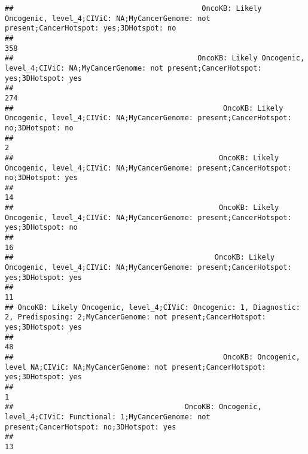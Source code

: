 \documentclass[
]{article}
\begin{document}
\begin{verbatim}
##                                            OncoKB: Likely Oncogenic, level_4;CIViC: NA;MyCancerGenome: not present;CancerHotspot: yes;3DHotspot: no 
##                                                                                                                                                 358 
##                                           OncoKB: Likely Oncogenic, level_4;CIViC: NA;MyCancerGenome: not present;CancerHotspot: yes;3DHotspot: yes 
##                                                                                                                                                 274 
##                                                 OncoKB: Likely Oncogenic, level_4;CIViC: NA;MyCancerGenome: present;CancerHotspot: no;3DHotspot: no 
##                                                                                                                                                   2 
##                                                OncoKB: Likely Oncogenic, level_4;CIViC: NA;MyCancerGenome: present;CancerHotspot: no;3DHotspot: yes 
##                                                                                                                                                  14 
##                                                OncoKB: Likely Oncogenic, level_4;CIViC: NA;MyCancerGenome: present;CancerHotspot: yes;3DHotspot: no 
##                                                                                                                                                  16 
##                                               OncoKB: Likely Oncogenic, level_4;CIViC: NA;MyCancerGenome: present;CancerHotspot: yes;3DHotspot: yes 
##                                                                                                                                                  11 
## OncoKB: Likely Oncogenic, level_4;CIViC: Oncogenic: 1, Diagnostic: 2, Predisposing: 2;MyCancerGenome: not present;CancerHotspot: yes;3DHotspot: yes 
##                                                                                                                                                  48 
##                                                 OncoKB: Oncogenic, level NA;CIViC: NA;MyCancerGenome: not present;CancerHotspot: yes;3DHotspot: yes 
##                                                                                                                                                   1 
##                                        OncoKB: Oncogenic, level_4;CIViC: Functional: 1;MyCancerGenome: not present;CancerHotspot: no;3DHotspot: yes 
##                                                                                                                                                  13 

\end{verbatim}
\end{document}
